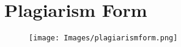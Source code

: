 \section*{Plagiarism Form}
\begin{figure}[H]
	\centering
	\texttt{[image: Images/plagiarismform.png]}
\end{figure}